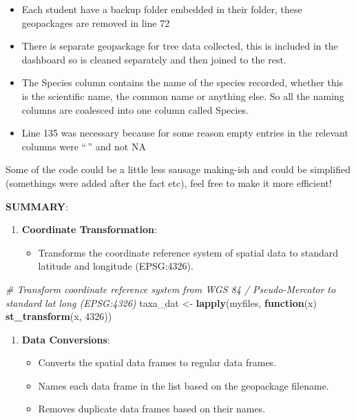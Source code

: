 \documentclass[
]{book}
\newenvironment{Shaded}{\begin{snugshade}}{\end{snugshade}}
\newcommand{\CommentTok}[1]{\textcolor[rgb]{0.56,0.35,0.01}{\textit{#1}}}
\newcommand{\ControlFlowTok}[1]{\textcolor[rgb]{0.13,0.29,0.53}{\textbf{#1}}}
\newcommand{\DecValTok}[1]{\textcolor[rgb]{0.00,0.00,0.81}{#1}}
\newcommand{\FunctionTok}[1]{\textcolor[rgb]{0.13,0.29,0.53}{\textbf{#1}}}
\newcommand{\NormalTok}[1]{#1}
\newcommand{\OtherTok}[1]{\textcolor[rgb]{0.56,0.35,0.01}{#1}}
\providecommand{\tightlist}{%
  \setlength{\itemsep}{0pt}\setlength{\parskip}{0pt}}
\theoremstyle{definition}
\theoremstyle{definition}
\theoremstyle{definition}
\theoremstyle{definition}
\theoremstyle{remark}
\begin{document}
\begin{itemize}
\tightlist
\item
  Each student have a backup folder embedded in their folder, these geopackages are removed in line 72
\item
  There is separate geopackage for tree data collected, this is included in the dashboard so is cleaned separately and then joined to the rest.
\item
  The Species column contains the name of the species recorded, whether this is the scientific name, the common name or anything else. So all the naming columns are coalesced into one column called Species.
\item
  Line 135 was necessary because for some reason empty entries in the relevant columns were ``\,'' and not NA
\end{itemize}

Some of the code could be a little less sausage making-ish and could be simplified (somethings were added after the fact etc), feel free to make it more efficient!

\textbf{SUMMARY}:

\begin{enumerate}
\def\labelenumi{\arabic{enumi}.}
\tightlist
\item
  \textbf{Coordinate Transformation}:

  \begin{itemize}
  \tightlist
  \item
    Transforms the coordinate reference system of spatial data to standard latitude and longitude (EPSG:4326).
  \end{itemize}
\end{enumerate}

\begin{Shaded}
\begin{Highlighting}[]
\CommentTok{\# Transform coordinate reference system from WGS 84 / Pseudo{-}Mercator to standard lat long (EPSG:4326)}
\NormalTok{taxa\_dat }\OtherTok{\textless{}{-}} \FunctionTok{lapply}\NormalTok{(myfiles, }\ControlFlowTok{function}\NormalTok{(x) }\FunctionTok{st\_transform}\NormalTok{(x, }\DecValTok{4326}\NormalTok{))}
\end{Highlighting}
\end{Shaded}

\begin{enumerate}
\def\labelenumi{\arabic{enumi}.}
\setcounter{enumi}{1}
\tightlist
\item
  \textbf{Data Conversions}:

  \begin{itemize}
  \tightlist
  \item
    Converts the spatial data frames to regular data frames.
  \item
    Names each data frame in the list based on the geopackage filename.
  \item
    Removes duplicate data frames based on their names.
  \end{itemize}
\end{enumerate}
\end{document}
